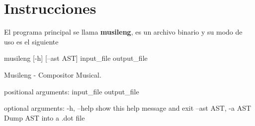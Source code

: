 \section{Instrucciones}

El programa principal se llama \textbf{musileng}, es un archivo binario y su 
modo de uso es el siguiente

\begin{code}
musileng [-h] [--ast AST] input_file output_file

Musileng - Compositor Musical.

positional arguments:
  input_file
  output_file

optional arguments:
  -h, --help         show this help message and exit
  --ast AST, -a AST  Dump AST into a .dot file

\end{code}